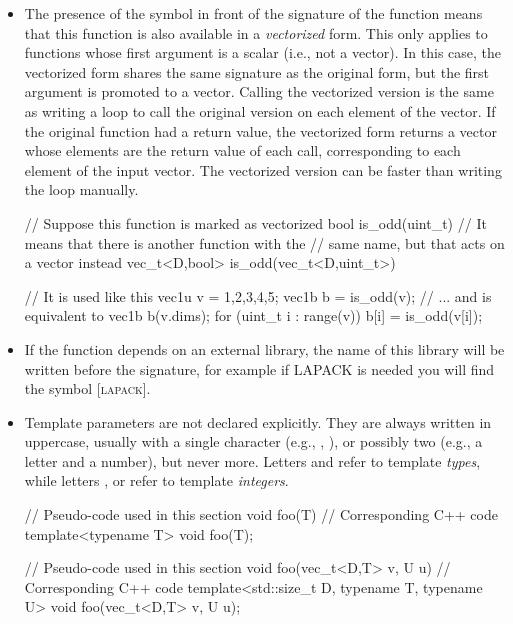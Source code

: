 \documentclass[12pt]{report}
\newcommand*\circled[1]{\tikz[baseline=(char.base)]{
            \node[shape=circle,draw,inner sep=0.0pt] (char) {#1};}}
\newcommand{\vectorfuncsym}{\circled{$\hspace{-1pt}\mathcal{V}$}\xspace}
\newcommand{\lapacksym}{\textsc{\small[lapack\small]}}
\newenvironment{example}
{
    \begin{mdframed}[style=example,frametitle={Example}]
}
{
    \end{mdframed}
}
\begin{document}
\begin{itemize}
\item The presence of the \vectorfuncsym symbol in front of the signature of the function means that this function is also available in a \emph{vectorized} form. This only applies to functions whose first argument is a scalar (i.e., not a vector). In this case, the vectorized form shares the same signature as the original form, but the first argument is promoted to a vector. Calling the vectorized version is the same as writing a loop to call the original version on each element of the vector. If the original function had a return value, the vectorized form returns a vector whose elements are the return value of each call, corresponding to each element of the input vector. The vectorized version can be faster than writing the loop manually.

\begin{example}
\begin{cppcode}
// Suppose this function is marked as vectorized
bool is_odd(uint_t)
// It means that there is another function with the
// same name, but that acts on a vector instead
vec_t<D,bool> is_odd(vec_t<D,uint_t>)

// It is used like this
vec1u v = {1,2,3,4,5};
vec1b b = is_odd(v);
// ... and is equivalent to
vec1b b(v.dims);
for (uint_t i : range(v)) {
    b[i] = is_odd(v[i]);
}
\end{cppcode}
\end{example}

\item If the function depends on an external library, the name of this library will be written before the signature, for example if LAPACK is needed you will find the symbol \lapacksym.

\item Template parameters are not declared explicitly. They are always written in uppercase, usually with a single character (e.g., , ), or possibly two (e.g., a letter and a number), but never more. Letters  and  refer to template \emph{types}, while letters ,  or  refer to template \emph{integers}.

\begin{example}
\begin{cppcode}
// Pseudo-code used in this section
void foo(T)
// Corresponding C++ code
template<typename T>
void foo(T);

// Pseudo-code used in this section
void foo(vec_t<D,T> v, U u)
// Corresponding C++ code
template<std::size_t D, typename T, typename U>
void foo(vec_t<D,T> v, U u);
\end{cppcode}
\end{example}


\end{itemize}
\end{document}
